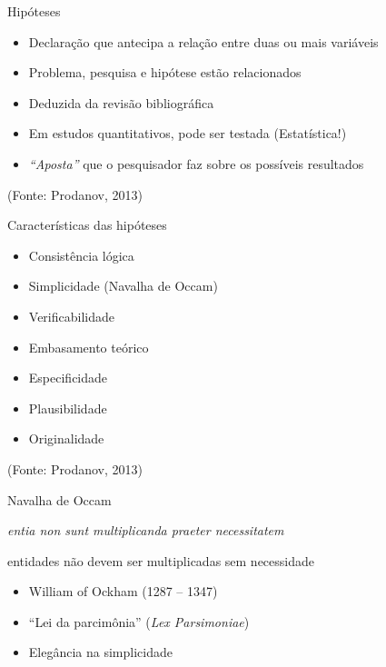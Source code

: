 \documentclass{beamer}
\begin{document}
\begin{frame}{Hipóteses}
  \begin{itemize}
    \footnotesize
  \item Declaração que antecipa a relação entre duas ou mais variáveis
    \bigskip
  \item Problema, pesquisa e hipótese estão relacionados
    \bigskip
  \item Deduzida da revisão bibliográfica
    \bigskip
  \item Em estudos quantitativos, pode ser testada (Estatística!)
    \bigskip
  \item {\em ``Aposta''} que o pesquisador faz sobre os possíveis
    resultados
  \end{itemize}

  \vfill
  \scriptsize
  \hfill (Fonte: Prodanov, 2013)
\end{frame}

\begin{frame}{Características das hipóteses}
  \begin{itemize}
    \footnotesize
  \item Consistência lógica
    \medskip
  \item Simplicidade (Navalha de Occam)
    \medskip
  \item Verificabilidade
    \medskip
  \item Embasamento teórico
    \medskip
  \item Especificidade
    \medskip
  \item Plausibilidade
    \medskip
  \item Originalidade
  \end{itemize}

  \vfill
  \scriptsize
  \hfill (Fonte: Prodanov, 2013)
\end{frame}

\begin{frame}{Navalha de Occam}
  \begin{block}{}
    \footnotesize
    {\em entia non sunt multiplicanda praeter necessitatem}

    \bigskip
    \small
    entidades não devem ser multiplicadas sem necessidade
  \end{block}
  \bigskip
  \begin{itemize}
    \footnotesize
  \item William of Ockham (1287 -- 1347)
    \medskip
  \item ``Lei da parcimônia'' ({\em Lex Parsimoniae})
    \medskip
  \item Elegância na simplicidade
  \end{itemize}
\end{frame}
\end{document}
